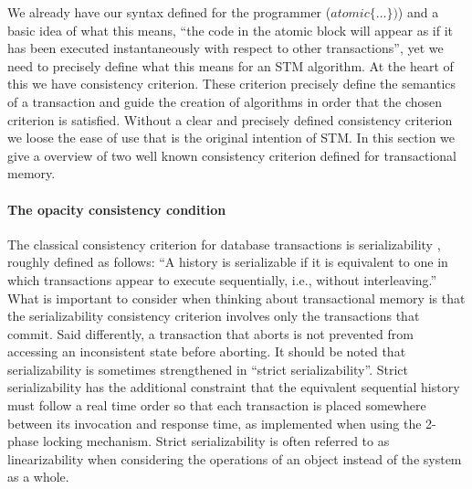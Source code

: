 We already have our syntax defined for the programmer ($atomic\{ \dots \})$) and
a basic idea of what this means, ``the code in the atomic block will appear as if
it has been executed instantaneously with respect to other transactions'', yet we need to precisely define what this
means for an STM algorithm.
At the heart of this we have consistency criterion.
These criterion precisely define the semantics of a transaction and guide the creation
of algorithms in order that the chosen criterion is satisfied.
Without a clear and precisely defined consistency criterion we loose the ease of use
that is the original intention of STM.
In this section we give a overview of two well known consistency criterion
defined for transactional memory.


\paragraph{The opacity consistency condition}
The classical consistency criterion for database
transactions is serializability \cite{P79},
roughly defined as follows: ``A history is serializable if it is equivalent to one in which
transactions appear to execute sequentially, i.e., without interleaving.''
What is important to consider when thinking about transactional memory
is that the serializability  consistency criterion 
involves only the transactions that commit. Said differently, 
a transaction  that aborts is not prevented from accessing an inconsistent
state   before aborting. 
It should be noted that serializability is sometimes strengthened in ``strict
serializability''.
Strict serializability has the additional constraint that the equivalent sequential history
must follow a real time order so that each transaction is placed somewhere between its
invocation and response time,
as  implemented  when   using   the   2-phase  locking
mechanism.
Strict serializability is often referred to as linearizability \cite{HW90}  when considering the operations
of an object instead of the system as a whole.

